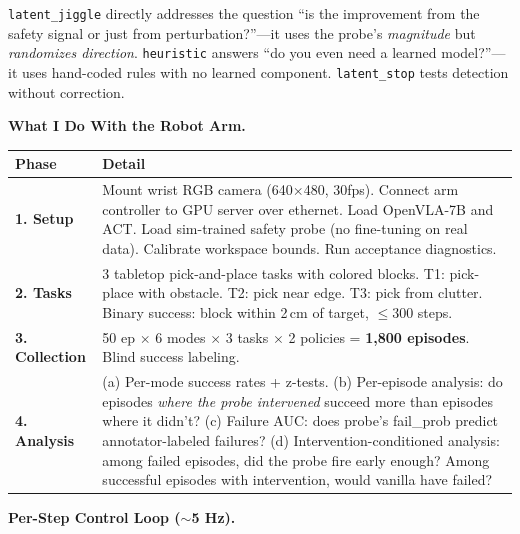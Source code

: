 \documentclass[10pt]{article}
\begin{document}
\vspace{2pt}
\texttt{latent\_jiggle} directly addresses the question ``is the improvement from the safety signal or just from perturbation?''---it uses the probe's \emph{magnitude} but \emph{randomizes direction}. \texttt{heuristic} answers ``do you even need a learned model?''---it uses hand-coded rules with no learned component. \texttt{latent\_stop} tests detection without correction.

\vspace{4pt}
\textbf{What I Do With the Robot Arm.}

\vspace{-2pt}
{\small
\begin{tabular}{@{}p{2.2cm}p{13cm}@{}}
\toprule
\textbf{Phase} & \textbf{Detail} \\
\midrule
\textbf{1. Setup} & Mount wrist RGB camera (640$\times$480, 30fps). Connect arm controller to GPU server over ethernet. Load OpenVLA-7B and ACT. Load sim-trained safety probe (no fine-tuning on real data). Calibrate workspace bounds. Run acceptance diagnostics. \\
\midrule
\textbf{2. Tasks} & 3 tabletop pick-and-place tasks with colored blocks. T1: pick-place with obstacle. T2: pick near edge. T3: pick from clutter. Binary success: block within 2\,cm of target, $\leq$300 steps. \\
\midrule
\textbf{3. Collection} & 50 ep $\times$ 6 modes $\times$ 3 tasks $\times$ 2 policies = \textbf{1,800 episodes}. Blind success labeling. \\
\midrule
\textbf{4. Analysis} & (a) Per-mode success rates + z-tests. (b) Per-episode analysis: do episodes \emph{where the probe intervened} succeed more than episodes where it didn't? (c) Failure AUC: does probe's fail\_prob predict annotator-labeled failures? (d) Intervention-conditioned analysis: among failed episodes, did the probe fire early enough? Among successful episodes with intervention, would vanilla have failed? \\
\bottomrule
\end{tabular}
}

\vspace{4pt}
\textbf{Per-Step Control Loop ($\sim$5 Hz).}
\end{document}
